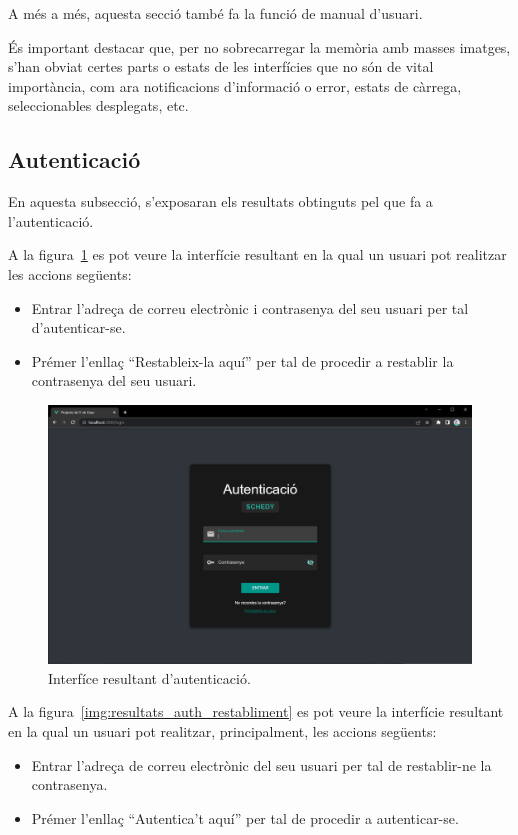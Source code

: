 \documentclass[a4paper,12pt]{ThesisStyle}
\begin{document}
A més a més, aquesta secció també fa la funció de manual d'usuari.

És important destacar que, per no sobrecarregar la memòria amb masses imatges, s'han obviat certes parts o estats de les interfícies que no són de vital importància, com ara notificacions d'informació o error, estats de càrrega, seleccionables desplegats, etc.

\newpage

\subsection{Autenticació}
\label{subsec:resultats_auth}

En aquesta subsecció, s'exposaran els resultats obtinguts pel que fa a l'autenticació.

A la figura~\ref{img:resultats_auth_autenticacio} es pot veure la interfície resultant en la qual un usuari pot realitzar les accions següents:
\begin{itemize}
  \item Entrar l'adreça de correu electrònic i contrasenya del seu usuari per tal d'autenticar-se.
  \item Prémer l'enllaç ``Restableix-la aquí'' per tal de procedir a restablir la contrasenya del seu usuari.
\end{itemize}

\begin{figure}[H]
  \centering
  \includegraphics[width=\textwidth]{assets/results/auth/autenticacio.png}
  \caption{\label{img:resultats_auth_autenticacio}Interfíce resultant d'autenticació.}
\end{figure}

\newpage

A la figura~\ref{img:resultats_auth_restabliment} es pot veure la interfície resultant en la qual un usuari pot realitzar, principalment, les accions següents:
\begin{itemize}
  \item Entrar l'adreça de correu electrònic del seu usuari per tal de restablir-ne la contrasenya.
  \item Prémer l'enllaç ``Autentica't aquí'' per tal de procedir a autenticar-se.
\end{itemize}
\end{document}
